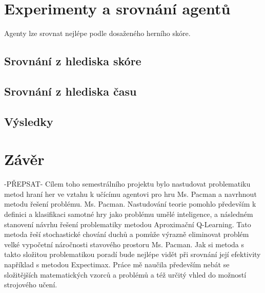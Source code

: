 \chapter{Experimenty a srovnání agentů}
Agenty lze srovnat nejlépe podle dosaženého herního skóre.
\section{Srovnání z hlediska skóre}
\section{Srovnání z hlediska času}
\section{Výsledky}

\chapter{Závěr}
-PŘEPSAT-
Cílem toho semestrálního projektu bylo nastudovat problematiku metod hraní her ve vztahu k učícímu agentovi pro hru Ms. Pacman a navrhnout metodu řešení problému. Ms. Pacman. Nastudování teorie pomohlo především k definici a klasifikaci samotné hry jako problému umělé inteligence, a následném stanovení návrhu řešení problematiky metodou Aproximační Q-Learning. Tato metoda řeší stochastické chování duchů a pomůže výrazně eliminovat problém velké vypočetní náročnosti stavového prostoru Ms. Pacman. Jak si metoda s takto složitou problematikou poradí bude nejlépe vidět při srovnání její efektivity například s metodou Expectimax. Práce mě naučila především nebát se složitějších matematických vzorců a problémů a též určitý vhled do možností strojového učení.

